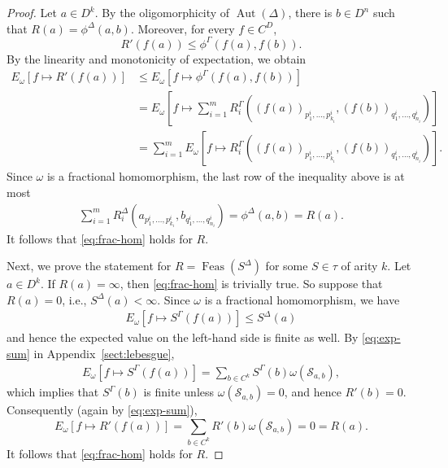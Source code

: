 \documentclass[nonacm]{acmart}
\DeclareMathOperator{\Aut}{Aut}
\DeclareMathOperator{\Feas}{Feas}
\begin{document}
\begin{proof}
Let $a \in D^k$. By the oligomorphicity of $\Aut(\Delta)$, there is $b \in D^n$ such that $R(a) = \phi^{\Delta}(a, b)$. Moreover, for every $f \in C^D$, 
\[ R'(f(a)) \leq \phi^{\Gamma}(f(a), f(b)).\]
By the linearity and monotonicity of expectation, we obtain
\begin{align*} 
E_\omega[f \mapsto R'(f(a))] 
&\leq E_\omega[f \mapsto \phi^{\Gamma}(f(a), f(b))]  \\
&= E_\omega[f \mapsto \sum_{i=1}^{m} R_i^{\Gamma}((f(a))_{p_1^i, \dots, p_{k_i}^i}, (f(b))_{q_1^i, \dots, q_{n_i}^i})]\\
&= \sum_{i=1}^{m} E_\omega[f \mapsto R_i^{\Gamma}((f(a))_{p_1^i, \dots, p_{k_i}^i}, (f(b))_{q_1^i, \dots, q_{n_i}^i})]. 
\end{align*}
Since $\omega$ is a fractional homomorphism, the last row of the inequality above is at most
\begin{align*}
\sum_{i=1}^{m}
R_i^{\Delta}(a_{p_1^i, \dots, p_{k_i}^i}, b_{q_1^i, \dots, q_{n_i}^i})
 = \phi^{\Delta}(a, b) = R(a).
\end{align*}
It follows that \eqref{eq:frac-hom} holds for $R$.


Next, we prove the statement for $R = \Feas(S^{\Delta})$ for some $S \in \tau$ of arity $k$. Let $a \in D^k$. 
If $R(a) = \infty$, then \eqref{eq:frac-hom} is trivially true. So suppose that $R(a) = 0$, i.e., $S^{\Delta}(a) < \infty$. Since $\omega$ is a fractional homomorphism, we have
\begin{align}
E_\omega[f \mapsto S^{\Gamma}(f(a))]
\leq S^{\Delta}(a) 
\end{align}
and hence the expected value on the left-hand side is finite as well.
By \eqref{eq:exp-sum} in Appendix~\ref{sect:lebesgue},
\begin{align}
E_\omega[f \mapsto S^{\Gamma}(f(a))] =  \sum_{b \in C^k} S^{\Gamma}(b) \omega({\mathscr S}_{a,b}),
\end{align}
which implies that $S^{\Gamma}(b)$ is finite unless $\omega({\mathscr S}_{a,b})=0$, and hence $R'(b)=0$. Consequently (again by \eqref{eq:exp-sum}),
\begin{equation*}
E_\omega[f \mapsto R'(f(a))]
= \sum_{b \in C^k} R'(b) \omega({\mathscr S}_{a,b}) = 0 = R(a). 
\end{equation*}
It follows that \eqref{eq:frac-hom} holds for $R$.


\end{proof}
\end{document}
